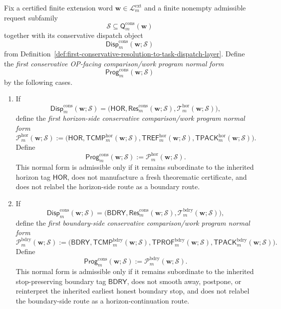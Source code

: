 \begin{definition}
\label{def:first-conservative-op-facing-comparison-work-program-normal-form}
Fix a certified finite extension word \(\mathbf w\in\mathcal L^{\mathrm{ext}}_{m}\) and a finite nonempty admissible request subfamily
\[
 \mathcal S \subseteq \mathsf{Q}^{\mathrm{cons}}_{m}(\mathbf w)
\]
together with its conservative dispatch object
\[
 \mathsf{Disp}^{\mathrm{cons}}_{m}(\mathbf w;\mathcal S)
\]
from Definition~\ref{def:first-conservative-resolution-to-task-dispatch-layer}. Define the \emph{first conservative OP-facing comparison/work program normal form}
\[
 \mathsf{Prog}^{\mathrm{cons}}_{m}(\mathbf w;\mathcal S)
\]
by the following cases.
\begin{enumerate}[label=(\roman*)]
 \item If
 \[
 \mathsf{Disp}^{\mathrm{cons}}_{m}(\mathbf w;\mathcal S)
 =
 \bigl(\mathsf{HOR},\mathsf{Res}^{\mathrm{cons}}_{m}(\mathbf w;\mathcal S),\mathcal T^{\mathrm{hor}}_{m}(\mathbf w;\mathcal S)\bigr),
 \]
 define the \emph{first horizon-side conservative comparison/work program normal form}
 \[
 \mathcal P^{\mathrm{hor}}_{m}(\mathbf w;\mathcal S)
 :=
 \bigl(
 \mathsf{HOR},
 \mathsf{TCMP}^{\mathrm{hor}}_{m}(\mathbf w;\mathcal S),
 \mathsf{TREF}^{\mathrm{hor}}_{m}(\mathbf w;\mathcal S),
 \mathsf{TPACK}^{\mathrm{hor}}_{m}(\mathbf w;\mathcal S)
 \bigr).
 \]
 Define
 \[
 \mathsf{Prog}^{\mathrm{cons}}_{m}(\mathbf w;\mathcal S)
 :=
 \mathcal P^{\mathrm{hor}}_{m}(\mathbf w;\mathcal S).
 \]
 This normal form is admissible only if it remains subordinate to the inherited horizon tag \(\mathsf{HOR}\), does not manufacture a fresh theorematic certificate, and does not relabel the horizon-side route as a boundary route.

 \item If
 \[
 \mathsf{Disp}^{\mathrm{cons}}_{m}(\mathbf w;\mathcal S)
 =
 \bigl(\mathsf{BDRY},\mathsf{Res}^{\mathrm{cons}}_{m}(\mathbf w;\mathcal S),\mathcal T^{\mathrm{bdry}}_{m}(\mathbf w;\mathcal S)\bigr),
 \]
 define the \emph{first boundary-side conservative comparison/work program normal form}
 \[
 \mathcal P^{\mathrm{bdry}}_{m}(\mathbf w;\mathcal S)
 :=
 \bigl(
 \mathsf{BDRY},
 \mathsf{TCMP}^{\mathrm{bdry}}_{m}(\mathbf w;\mathcal S),
 \mathsf{TPROF}^{\mathrm{bdry}}_{m}(\mathbf w;\mathcal S),
 \mathsf{TPACK}^{\mathrm{bdry}}_{m}(\mathbf w;\mathcal S)
 \bigr).
 \]
 Define
 \[
 \mathsf{Prog}^{\mathrm{cons}}_{m}(\mathbf w;\mathcal S)
 :=
 \mathcal P^{\mathrm{bdry}}_{m}(\mathbf w;\mathcal S).
 \]
 This normal form is admissible only if it remains subordinate to the inherited stop-preserving boundary tag \(\mathsf{BDRY}\), does not smooth away, postpone, or reinterpret the inherited earliest honest boundary stop, and does not relabel the boundary-side route as a horizon-continuation route.
\end{enumerate}
\end{definition}

